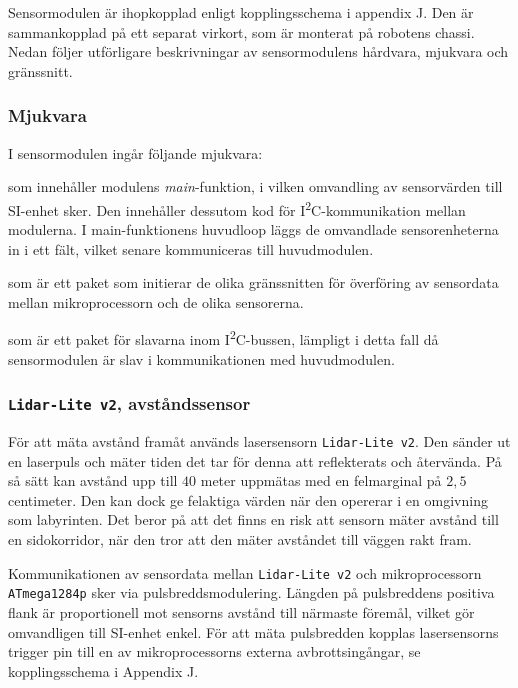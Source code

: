 \documentclass[11pt]{article}
\begin{document}
\begin{flushleft}
Sensormodulen är ihopkopplad enligt kopplingsschema i appendix J. Den är sammankopplad på ett separat virkort, som är monterat på robotens chassi. Nedan följer utförligare beskrivningar av sensormodulens hårdvara, mjukvara och gränssnitt.

\subsubsection{Mjukvara}
I sensormodulen ingår följande mjukvara: 

\begin{description}[style=unboxed, leftmargin=0cm]
  \item[sensorModule.c] som innehåller modulens \textit{main}-funktion, i vilken omvandling av sensorvärden till SI-enhet sker. Den innehåller dessutom kod för I\textsuperscript{2}C-kommunikation mellan modulerna. I main-funktionens huvudloop läggs de omvandlade sensorenheterna in i ett fält, vilket senare kommuniceras till huvudmodulen.
  \item[sensorInit.h] som är ett paket som initierar de olika gränssnitten för överföring av sensordata mellan mikroprocessorn och de olika sensorerna.
  \item[I2C\_slave.h] som är ett paket för slavarna inom I\textsuperscript{2}C-bussen, lämpligt i detta fall då sensormodulen är slav i kommunikationen med huvudmodulen.
\end{description}

\subsubsection{\texttt{Lidar-Lite v2}, avståndssensor}
För att mäta avstånd framåt används lasersensorn \verb+Lidar-Lite v2+. Den sänder ut en laserpuls och mäter tiden det tar för denna att reflekterats och återvända. På så sätt kan avstånd upp till $40$ meter uppmätas med en felmarginal på $2,5$ centimeter. Den kan dock ge felaktiga värden när den opererar i en omgivning som labyrinten. Det beror på att det finns en risk att sensorn mäter avstånd till en sidokorridor, när den tror att den mäter avståndet till väggen rakt fram.

Kommunikationen av sensordata mellan \verb+Lidar-Lite v2+ och mikroprocessorn \verb+ATmega1284p+ sker via pulsbreddsmodulering. Längden på pulsbreddens positiva flank är proportionell mot sensorns avstånd till närmaste föremål, vilket gör omvandligen till SI-enhet enkel. För att mäta pulsbredden kopplas lasersensorns trigger pin till en av mikroprocessorns externa avbrottsingångar, se kopplingsschema i Appendix J. 


\end{flushleft}
\end{document}

